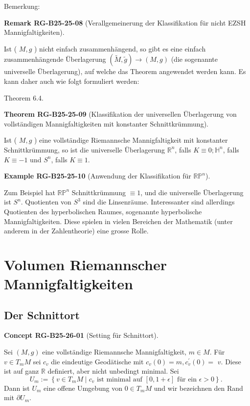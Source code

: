 \documentclass[10pt, letterpaper]{article}
\newcommand{\CustomHeading}[3]{%
  \par\medskip\noindent%
  \textbf{#1 #2} \textnormal{(#3)}.\enskip%
}
\newenvironment{THEO}[2]{\begin{unitbox}\CustomHeading{Theorem}{#1}{#2}}{\end{unitbox}}
\newenvironment{REM}[2]{\begin{unitbox}\CustomHeading{Remark}{#1}{#2}}{\end{unitbox}}
\newenvironment{EXA}[2]{\begin{unitbox}\CustomHeading{Example}{#1}{#2}}{\end{unitbox}}
\newenvironment{CONC}[2]{\begin{unitbox}\CustomHeading{Concept}{#1}{#2}}{\end{unitbox}}
\begin{document}
Bemerkung: 


\begin{REM}{RG-B25-25-08}{Verallgemeinerung der Klassifikation für nicht EZSH Mannigfaltigkeiten}
Ist ( $M, g$ ) nicht einfach zusammenhängend, so gibt es eine einfach zusammenhängende Überlagerung $(\tilde{M}, \tilde{g}) \rightarrow(M, g)$ (die sogenannte universelle Überlagerung), auf welche das Theorem angewendet werden kann. Es kann daher auch wie folgt formuliert werden:
\end{REM}

Theorem 6.4. 

\begin{THEO}{RG-B25-25-09}{Klassifikation der universellen Überlagerung von vollständigen Mannigfaltigkeiten mit konstanter Schnittkrümmung}
Ist ( $M, g$ ) eine vollständige Riemannsche Mannigfaltigkeit mit konstanter Schnittkrümmung, so ist die universelle Überlagerung $\mathbb{R}^{n}$, falls $K \equiv 0 ; \mathbb{H}^{n}$, falls $K \equiv-1$ und $S^{n}$, falls $K \equiv 1$.
\end{THEO}

\begin{EXA}{RG-B25-25-10}{Anwendung der Klassifikation für $\mathbb{R P}^{n}$}
Zum Beispiel hat $\mathbb{R P}^{n}$ Schnittkrümmung $\equiv 1$, und die universelle Überlagerung ist $S^{n}$. Quotienten von $S^{3}$ sind die Linsenräume. Interessanter sind allerdings Quotienten des hyperbolischen Raumes, sogenannte hyperbolische Mannigfaltigkeiten. Diese spielen in vielen Bereichen der Mathematik (unter anderem in der Zahlentheorie) eine grosse Rolle.
\end{EXA}



\pagebreak


\section{Volumen Riemannscher Mannigfaltigkeiten}


\subsection{Der Schnittort}


\begin{CONC}{RG-B25-26-01}{Setting für Schnittort}
Sei $(M, g)$ eine vollständige Riemannsche Mannigfaltigkeit, $m \in M$. Für $v \in T_{m} M$ sei $c_{v}$ die eindeutige Geodätische mit $c_{v}(0)=m, c_{v}^{\prime}(0)=$ $v$. Diese ist auf ganz $\mathbb{R}$ definiert, aber nicht unbedingt minimal. Sei
$$
U_{m}:=\left\{v \in T_{m} M \mid c_{v} \text { ist minimal auf }[0,1+\epsilon] \text { für ein } \epsilon>0\right\} \text {. }
$$
Dann ist $U_{m}$ eine offene Umgebung von $0 \in T_{m} M$ und wir bezeichnen den Rand mit $\partial U_{m}$.
\end{CONC}
\end{document}
